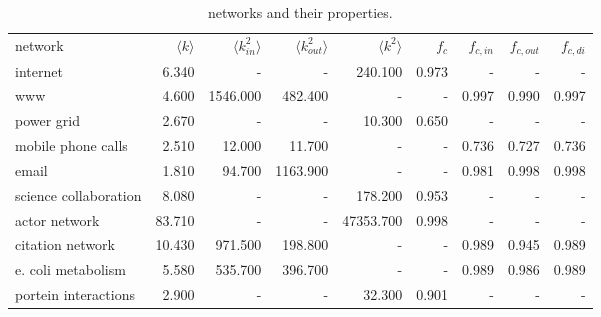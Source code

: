 \begin{table}[H]
\caption{networks and their properties.}
\label{table:results}
\begin{tabular}{lrrrrrrrr}
network & $\langle k \rangle$ & $\langle k_{in}^2 \rangle$ & $\langle k_{out}^2 \rangle$ & $\langle k^2 \rangle$ & $f_{c}$ & $f_{c, in}$ & $f_{c, out}$ & $f_{c, di}$ \\
internet & 6.340 & - & - & 240.100 & 0.973 & - & - & - \\
www & 4.600 & 1546.000 & 482.400 & - & - & 0.997 & 0.990 & 0.997 \\
power grid & 2.670 & - & - & 10.300 & 0.650 & - & - & - \\
mobile phone calls & 2.510 & 12.000 & 11.700 & - & - & 0.736 & 0.727 & 0.736 \\
email & 1.810 & 94.700 & 1163.900 & - & - & 0.981 & 0.998 & 0.998 \\
science collaboration & 8.080 & - & - & 178.200 & 0.953 & - & - & - \\
actor network & 83.710 & - & - & 47353.700 & 0.998 & - & - & - \\
citation network & 10.430 & 971.500 & 198.800 & - & - & 0.989 & 0.945 & 0.989 \\
e. coli metabolism & 5.580 & 535.700 & 396.700 & - & - & 0.989 & 0.986 & 0.989 \\
portein interactions & 2.900 & - & - & 32.300 & 0.901 & - & - & - \\
\end{tabular}
\end{table}
